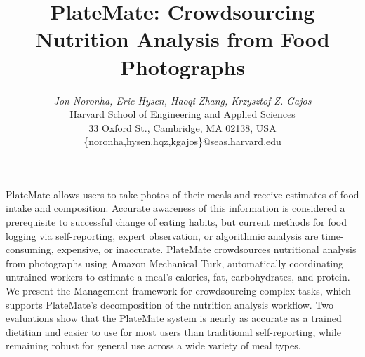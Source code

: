 \documentclass{article}
\begin{document}

 \toappear{}

%

\title{\vspace{2mm}PlateMate: Crowdsourcing Nutrition Analysis from Food Photographs}


\author{
\parbox[t]{12cm}{\centering
	     {\em Jon Noronha, Eric Hysen, Haoqi Zhang, Krzysztof Z. Gajos}\\
	     Harvard School of Engineering and Applied Sciences\\
	   	33 Oxford St.,
	     Cambridge, MA 02138, USA\\
	     \{noronha,hysen,hqz,kgajos\}@seas.harvard.edu}
}

\maketitle



\thispagestyle{fancy}
\pagestyle{fancy}
\lhead{}
\rhead{}


\abstract
PlateMate allows users to take photos of their meals and receive estimates of food intake and composition. Accurate awareness of this information is considered a prerequisite to successful change of eating habits, but current methods for food logging via self-reporting, expert observation, or algorithmic analysis are time-consuming, expensive, or inaccurate.  PlateMate crowdsources nutritional analysis from photographs using Amazon Mechanical Turk, automatically coordinating untrained workers to estimate a meal's calories, fat, carbohydrates, and protein.  We present the Management framework for crowdsourcing complex tasks, which supports PlateMate's decomposition of the nutrition analysis workflow. Two evaluations show that the PlateMate system is nearly as accurate as a trained dietitian and easier to use for most users than traditional self-reporting, while remaining robust for general use across a wide variety of meal types.
\end{document}
